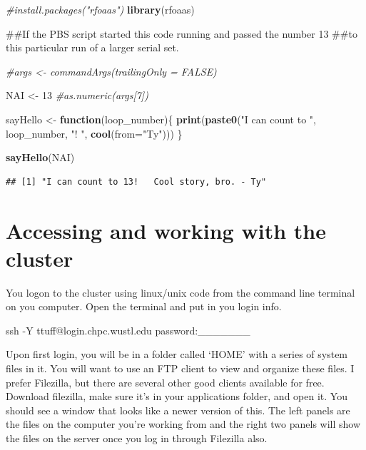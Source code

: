 \documentclass[]{book}
\newenvironment{Shaded}{\begin{snugshade}}{\end{snugshade}}
\newcommand{\KeywordTok}[1]{\textcolor[rgb]{0.13,0.29,0.53}{\textbf{{#1}}}}
\newcommand{\DataTypeTok}[1]{\textcolor[rgb]{0.13,0.29,0.53}{{#1}}}
\newcommand{\DecValTok}[1]{\textcolor[rgb]{0.00,0.00,0.81}{{#1}}}
\newcommand{\StringTok}[1]{\textcolor[rgb]{0.31,0.60,0.02}{{#1}}}
\newcommand{\CommentTok}[1]{\textcolor[rgb]{0.56,0.35,0.01}{\textit{{#1}}}}
\newcommand{\FunctionTok}[1]{\textcolor[rgb]{0.00,0.00,0.00}{{#1}}}
\newcommand{\ControlFlowTok}[1]{\textcolor[rgb]{0.13,0.29,0.53}{\textbf{{#1}}}}
\newcommand{\ExtensionTok}[1]{{#1}}
\newcommand{\NormalTok}[1]{{#1}}
\theoremstyle{definition}
\theoremstyle{definition}
\theoremstyle{definition}
\theoremstyle{remark}
\begin{document}
\begin{Shaded}
\begin{Highlighting}[]
\CommentTok{#install.packages("rfoaas")}
\KeywordTok{library}\NormalTok{(rfoaas)}

\NormalTok{##If the PBS script started this code running and passed the number 13}
\NormalTok{##to this particular run of a larger serial set. }


\CommentTok{#args <- commandArgs(trailingOnly = FALSE) }

\NormalTok{NAI <-}\StringTok{ }\DecValTok{13} \CommentTok{#as.numeric(args[7])}

\NormalTok{    sayHello <-}\StringTok{ }\ControlFlowTok{function}\NormalTok{(loop_number)\{}
      \KeywordTok{print}\NormalTok{(}\KeywordTok{paste0}\NormalTok{(}\StringTok{"I can count to "}\NormalTok{, loop_number, }\StringTok{"!   "}\NormalTok{, }\KeywordTok{cool}\NormalTok{(}\DataTypeTok{from=}\StringTok{"Ty"}\NormalTok{)))}
\NormalTok{    \}}

    \KeywordTok{sayHello}\NormalTok{(NAI)}
\end{Highlighting}
\end{Shaded}

\begin{verbatim}
## [1] "I can count to 13!   Cool story, bro. - Ty"
\end{verbatim}

\section{Accessing and working with the
cluster}\label{accessing-and-working-with-the-cluster}

You logon to the cluster using linux/unix code from the command line
terminal on you computer. Open the terminal and put in you login info.

\begin{Shaded}
\begin{Highlighting}[]
\FunctionTok{ssh}\NormalTok{ -Y ttuff@login.chpc.wustl.edu}
\ExtensionTok{password}\NormalTok{:_______}
\end{Highlighting}
\end{Shaded}

Upon first login, you will be in a folder called `HOME' with a series of
system files in it. You will want to use an FTP client to view and
organize these files. I prefer Filezilla, but there are several other
good clients available for free. Download filezilla, make sure it's in
your applications folder, and open it. You should see a window that
looks like a newer version of this. The left panels are the files on the
computer you're working from and the right two panels will show the
files on the server once you log in through Filezilla also.
\end{document}
